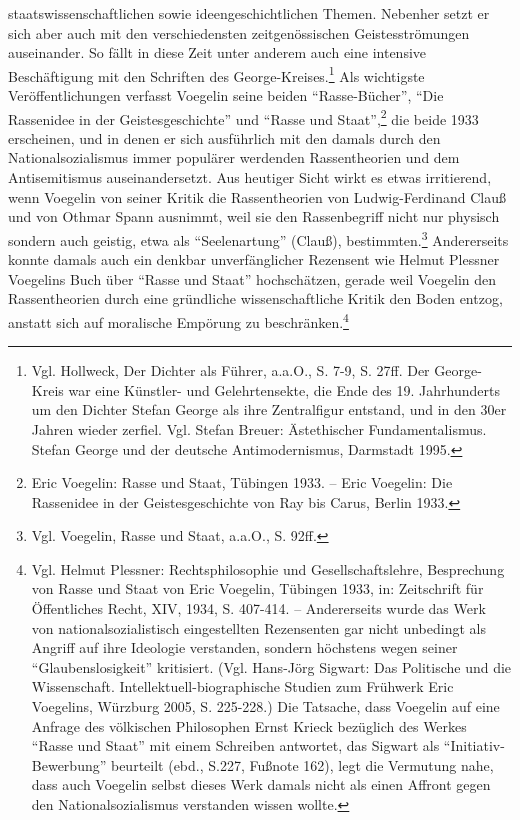 \documentclass[12pt,a4paper,ngerman]{article}
\begin{document}
staatswissenschaftlichen sowie ideengeschichtlichen Themen. Nebenher
setzt er sich aber auch mit den verschiedensten zeitgenössischen
Geistesströmungen auseinander. So fällt in diese Zeit unter anderem
auch eine intensive Beschäftigung mit den Schriften des
George-Kreises.\footnote{Vgl. Hollweck, Der Dichter als Führer,
  a.a.O., S. 7-9, S. 27ff. Der George-Kreis war eine Künstler- und
  Gelehrtensekte, die Ende des 19. Jahrhunderts um den Dichter Stefan
  George als ihre Zentralfigur entstand, und in den 30er Jahren wieder
  zerfiel. Vgl. Stefan Breuer: Ästethischer Fundamentalismus. Stefan
  George und der deutsche Antimodernismus, Darmstadt 1995.} Als
wichtigste Veröffentlichungen verfasst Voegelin seine beiden
"`Rasse-Bücher"', "`Die Rassenidee in der Geistesgeschichte"' und
"`Rasse und Staat"',\footnote{Eric Voegelin: Rasse und Staat, Tübingen
  1933. -- Eric Voegelin: Die Rassenidee in der Geistesgeschichte von
  Ray bis Carus, Berlin 1933.} die beide 1933 erscheinen, und in denen
er sich ausführlich mit den damals durch den Nationalsozialismus immer
populärer werdenden Rassentheorien und dem Antisemitismus
auseinandersetzt. Aus heutiger Sicht wirkt es etwas irritierend, wenn
Voegelin von seiner Kritik die Rassentheorien von Ludwig-Ferdinand
Clauß und von Othmar Spann ausnimmt, weil sie den Rassenbegriff nicht
nur physisch sondern auch geistig, etwa als "`Seelenartung"' (Clauß),
bestimmten.\footnote{Vgl.  Voegelin, Rasse und Staat, a.a.O., S.
  92ff.} Andererseits konnte damals auch ein denkbar unverfänglicher
Rezensent wie Helmut Plessner Voegelins Buch über "`Rasse und Staat"'
hochschätzen, gerade weil Voegelin den Rassentheorien durch eine
gründliche wissenschaftliche Kritik den Boden entzog, anstatt sich auf
moralische Empörung zu beschränken.\footnote{Vgl.  Helmut Plessner:
  Rechtsphilosophie und Gesellschaftslehre, Besprechung von Rasse und
  Staat von Eric Voegelin, Tübingen 1933, in: Zeitschrift für
  Öffentliches Recht, XIV, 1934, S. 407-414. -- Andererseits wurde das
  Werk von nationalsozialistisch eingestellten Rezensenten gar nicht
  unbedingt als Angriff auf ihre Ideologie verstanden, sondern
  höchstens wegen seiner "`Glaubenslosigkeit"' kritisiert. (Vgl.
  Hans-Jörg Sigwart: Das Politische und die Wissenschaft.
  Intellektuell-biographische Studien zum Frühwerk Eric Voegelins,
  Würzburg 2005, S. 225-228.) Die Tatsache, dass Voegelin auf eine
  Anfrage des völkischen Philosophen Ernst Krieck bezüglich des Werkes
  "`Rasse und Staat"' mit einem Schreiben antwortet, das Sigwart als
  "`Initiativ-Bewerbung"' beurteilt (ebd., S.227, Fußnote 162), legt
  die Vermutung nahe, dass auch Voegelin selbst dieses Werk damals
  nicht als einen Affront gegen den Nationalsozialismus verstanden
  wissen wollte.}
\end{document}

